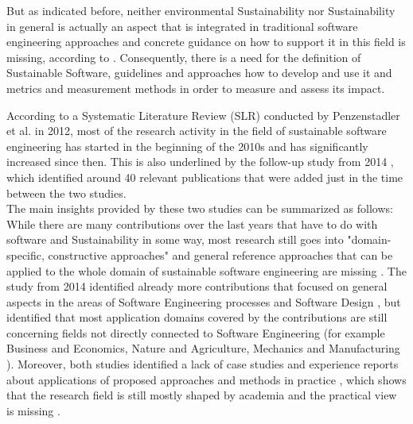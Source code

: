 \documentclass[oribibl]{llncs}
\begin{document}
But as indicated before, neither environmental Sustainability nor Sustainability in general is actually an aspect that is integrated in traditional software engineering approaches and concrete guidance on how to support it in this field is missing, according to \cite{penzenstadler_supporting_2012}. Consequently, there is a need for the definition of Sustainable Software, guidelines and approaches how to develop and use it and metrics and measurement methods in order to measure and assess its impact.

According to a Systematic Literature Review (SLR) %
conducted by Penzenstadler et al. \cite{penzenstadler_sustainability_2012} in 2012, most of the research activity in the field of sustainable software engineering has started in the beginning of the 2010s and has significantly increased since then. This is also underlined by the follow-up study from 2014 \cite{penzenstadler_systematic_2014}, which identified around 40 relevant publications that were added just in the time between the two studies.\\
The main insights provided by these two studies can be summarized as follows: While there are many contributions over the last years that have to do with software and Sustainability in some way, most research still goes into "domain-specific, constructive approaches" \cite{penzenstadler_sustainability_2012} and general reference approaches that can be applied to the whole domain of sustainable software engineering are missing \cite{penzenstadler_sustainability_2012}. The study from 2014 identified already more contributions that focused on general aspects in the areas of Software Engineering processes and Software Design \cite{penzenstadler_systematic_2014}, but identified that most application domains covered by the contributions are still concerning fields not directly connected to Software Engineering (for example Business and Economics, Nature and Agriculture, Mechanics and Manufacturing \cite{penzenstadler_systematic_2014}). %
Moreover, both studies identified a lack of case studies and experience reports about applications of proposed approaches and methods in practice \cite{penzenstadler_sustainability_2012}, which shows that the research field is still mostly shaped by academia and the practical view is missing %
\cite{penzenstadler_systematic_2014}. %
\end{document}
